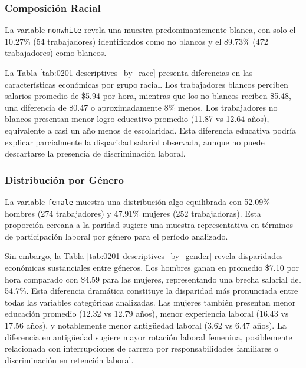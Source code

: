 \documentclass[12pt]{article}
\begin{document}





\subsubsection*{Composición Racial}

La variable \texttt{nonwhite} revela una muestra predominantemente blanca, con solo el 10.27\% (54 trabajadores) identificados como no blancos y el 89.73\% (472 trabajadores) como blancos.

La Tabla \ref{tab:0201-descriptives_by_race} presenta diferencias en las características económicas por grupo racial. Los trabajadores blancos perciben salarios promedio de \$5.94 por hora, mientras que los no blancos reciben \$5.48, una diferencia de \$0.47 o aproximadamente 8\% menos. Los trabajadores no blancos presentan menor logro educativo promedio (11.87 vs 12.64 años), equivalente a casi un año menos de escolaridad. Esta diferencia educativa podría explicar parcialmente la disparidad salarial observada, aunque no puede descartarse la presencia de discriminación laboral.



\subsubsection*{Distribución por Género}

La variable \texttt{female} muestra una distribución algo equilibrada con 52.09\% hombres (274 trabajadores) y 47.91\% mujeres (252 trabajadoras). Esta proporción cercana a la paridad sugiere una muestra representativa en términos de participación laboral por género para el período analizado.

Sin embargo, la Tabla \ref{tab:0201-descriptives_by_gender} revela disparidades económicas sustanciales entre géneros. Los hombres ganan en promedio \$7.10 por hora comparado con \$4.59 para las mujeres, representando una brecha salarial del 54.7\%. Esta diferencia dramática constituye la disparidad más pronunciada entre todas las variables categóricas analizadas. Las mujeres también presentan menor educación promedio (12.32 vs 12.79 años), menor experiencia laboral (16.43 vs 17.56 años), y notablemente menor antigüedad laboral (3.62 vs 6.47 años). La diferencia en antigüedad sugiere mayor rotación laboral femenina, posiblemente relacionada con interrupciones de carrera por responsabilidades familiares o discriminación en retención laboral.
\end{document}
